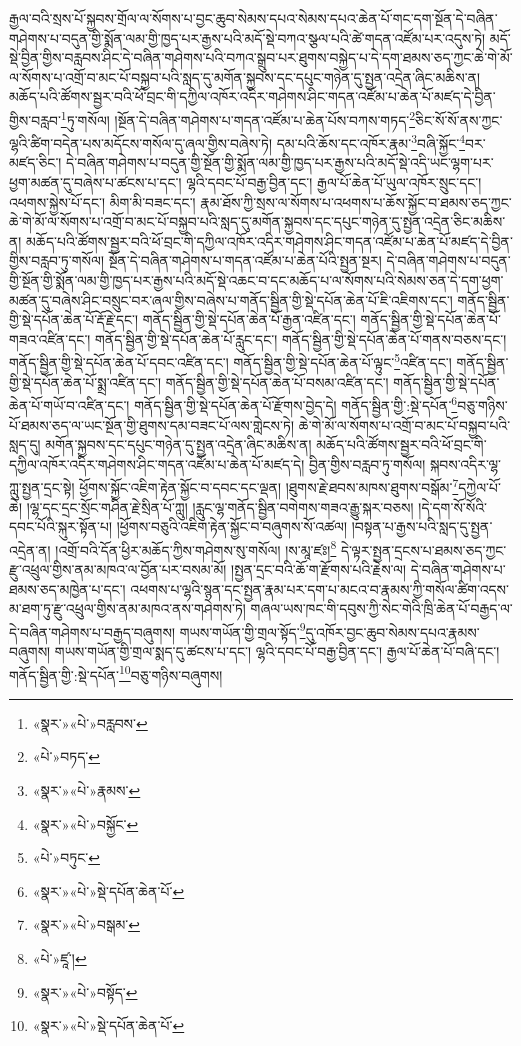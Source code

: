 རྒྱལ་བའི་སྲས་པོ་སྐྱབས་གྲོལ་ལ་སོགས་པ་བྱང་ཆུབ་སེམས་དཔའ་སེམས་དཔའ་ཆེན་པོ་གང་དག་སྔོན་དེ་བཞིན་གཤེགས་པ་བདུན་གྱི་སྨོན་ལམ་གྱི་ཁྱད་པར་རྒྱས་པའི་མདོ་སྡེ་བཀའ་སྩལ་པའི་ཚེ་གདན་འཛོམ་པར་འདུས་ཏེ། མདོ་སྡེ་བྱིན་གྱིས་བརླབས་ཤིང་དེ་བཞིན་གཤེགས་པའི་བཀའ་སྒྲུབ་པར་ཐུགས་བསྐྱེད་པ་དེ་དག་ཐམས་ཅད་ཀྱང་ཆེ་གེ་མོ་ལ་སོགས་པ་འགྲོ་བ་མང་པོ་བསྐྱབ་པའི་སླད་དུ་མགོན་སྐྱབས་དང་དཔུང་གཉེན་དུ་སྤྱན་འདྲེན་ཞིང་མཆིས་ན། མཆོད་པའི་ཚོགས་སྦྱར་བའི་ཕོ་བྲང་གི་དཀྱིལ་འཁོར་འདིར་གཤེགས་ཤིང་གདན་འཛོམ་པ་ཆེན་པོ་མཛད་དེ་བྱིན་གྱིས་བརླབ་\footnote{«སྣར་»«པེ་»བརླབས་}ཏུ་གསོལ། །སྔོན་དེ་བཞིན་གཤེགས་པ་གདན་འཛོམ་པ་ཆེན་པོས་བཀས་གཏད་\footnote{«པེ་»བཏད་}ཅིང་སོ་སོ་ནས་ཀྱང་ལྷའི་ཚིག་བདེན་པས་མདོངས་གསོལ་དུ་ཞལ་གྱིས་བཞེས་ཏེ། དམ་པའི་ཆོས་དང་འཁོར་རྣམ་\footnote{«སྣར་»«པེ་»རྣམས་}བཞི་སྐྱོང་\footnote{«སྣར་»«པེ་»བསྐྱོང་}བར་མཛད་ཅིང་། དེ་བཞིན་གཤེགས་པ་བདུན་གྱི་སྔོན་གྱི་སྨོན་ལམ་གྱི་ཁྱད་པར་རྒྱས་པའི་མདོ་སྡེ་འདི་ཡང་ལྷག་པར་ཕྱག་མཚན་དུ་བཞེས་པ་ཚངས་པ་དང་། ལྷའི་དབང་པོ་བརྒྱ་བྱིན་དང་། རྒྱལ་པོ་ཆེན་པོ་ཡུལ་འཁོར་སྲུང་དང་། འཕགས་སྐྱེས་པོ་དང་། མིག་མི་བཟང་དང་། རྣམ་ཐོས་ཀྱི་སྲས་ལ་སོགས་པ་འཕགས་པ་ཆོས་སྐྱོང་བ་ཐམས་ཅད་ཀྱང་ཆེ་གེ་མོ་ལ་སོགས་པ་འགྲོ་བ་མང་པོ་བསྐྱབ་པའི་སླད་དུ་མགོན་སྐྱབས་དང་དཔུང་གཉེན་དུ་སྤྱན་འདྲེན་ཅིང་མཆིས་ན། མཆོད་པའི་ཚོགས་སྦྱར་བའི་ཕོ་བྲང་གི་དཀྱིལ་འཁོར་འདིར་གཤེགས་ཤིང་གདན་འཛོམ་པ་ཆེན་པོ་མཛད་དེ་བྱིན་གྱིས་བརླབ་ཏུ་གསོལ། སྔོན་དེ་བཞིན་གཤེགས་པ་གདན་འཛོམ་པ་ཆེན་པོའི་སྤྱན་སྔར། དེ་བཞིན་གཤེགས་པ་བདུན་གྱི་སྔོན་གྱི་སྨོན་ལམ་གྱི་ཁྱད་པར་རྒྱས་པའི་མདོ་སྡེ་འཆང་བ་དང་མཆོད་པ་ལ་སོགས་པའི་སེམས་ཅན་དེ་དག་ཕྱག་མཚན་དུ་བཞེས་ཤིང་བསྲུང་བར་ཞལ་གྱིས་བཞེས་པ་གནོད་སྦྱིན་གྱི་སྡེ་དཔོན་ཆེན་པོ་ཇི་འཇིགས་དང་། གནོད་སྦྱིན་གྱི་སྡེ་དཔོན་ཆེན་པོ་རྡོ་རྗེ་དང་། གནོད་སྦྱིན་གྱི་སྡེ་དཔོན་ཆེན་པོ་རྒྱན་འཛིན་དང་། གནོད་སྦྱིན་གྱི་སྡེ་དཔོན་ཆེན་པོ་གཟའ་འཛིན་དང་། གནོད་སྦྱིན་གྱི་སྡེ་དཔོན་ཆེན་པོ་རླུང་དང་། གནོད་སྦྱིན་གྱི་སྡེ་དཔོན་ཆེན་པོ་གནས་བཅས་དང་། གནོད་སྦྱིན་གྱི་སྡེ་དཔོན་ཆེན་པོ་དབང་འཛིན་དང་། གནོད་སྦྱིན་གྱི་སྡེ་དཔོན་ཆེན་པོ་ལྟུང་\footnote{«པེ་»བཏུང་}འཛིན་དང་། གནོད་སྦྱིན་གྱི་སྡེ་དཔོན་ཆེན་པོ་སྨྲ་འཛིན་དང་། གནོད་སྦྱིན་གྱི་སྡེ་དཔོན་ཆེན་པོ་བསམ་འཛིན་དང་། གནོད་སྦྱིན་གྱི་སྡེ་དཔོན་ཆེན་པོ་གཡོ་བ་འཛིན་དང་། གནོད་སྦྱིན་གྱི་སྡེ་དཔོན་ཆེན་པོ་རྫོགས་བྱེད་དེ། གནོད་སྦྱིན་གྱི་:སྡེ་དཔོན་\footnote{«སྣར་»«པེ་»སྡེ་དཔོན་ཆེན་པོ་}བཅུ་གཉིས་པོ་ཐམས་ཅད་ལ་ཡང་སྔོན་གྱི་ཐུགས་དམ་བཟང་པོ་ལས་གླེངས་ཏེ། ཆེ་གེ་མོ་ལ་སོགས་པ་འགྲོ་བ་མང་པོ་བསྐྱབ་པའི་སླད་དུ། མགོན་སྐྱབས་དང་དཔུང་གཉེན་དུ་སྤྱན་འདྲེན་ཞིང་མཆིས་ན། མཆོད་པའི་ཚོགས་སྦྱར་བའི་ཕོ་བྲང་གི་དཀྱིལ་འཁོར་འདིར་གཤེགས་ཤིང་གདན་འཛོམ་པ་ཆེན་པོ་མཛད་དེ། བྱིན་གྱིས་བརླབ་ཏུ་གསོལ། སྐབས་འདིར་ལྷ་ཀླུ་སྤྱན་དྲང་སྟེ། ཕྱོགས་སྐྱོང་འཇིག་རྟེན་སྐྱོང་བ་དབང་དང་ལྡན། །ཐུགས་རྗེ་ཐབས་མཁས་ཐུགས་བསྒོམ་\footnote{«སྣར་»«པེ་»བསྒམ་}དཀྱེལ་པོ་ཆེ། །ལྷ་དང་དྲང་སྲོང་གཤིན་རྗེ་སྲིན་པོ་ཀླུ། །རླུང་ལྷ་གནོད་སྦྱིན་བགེགས་གཟའ་རྒྱུ་སྐར་བཅས། །དེ་དག་སོ་སོའི་དབང་པོའི་སྐུར་སྟོན་པ། །ཕྱོགས་བཅུའི་འཇིག་རྟེན་སྐྱོང་བ་བཞུགས་སོ་འཚལ། །བསྟན་པ་རྒྱས་པའི་སླད་དུ་སྤྱན་འདྲེན་ན། །འགྲོ་བའི་དོན་ཕྱིར་མཆོད་ཀྱིས་གཤེགས་སུ་གསོལ། །ས་མཱ་ཛཿ།\footnote{«པེ་»ཛཱ་།} དེ་ལྟར་སྤྱན་དྲངས་པ་ཐམས་ཅད་ཀྱང་རྫུ་འཕྲུལ་གྱིས་ནམ་མཁའ་ལ་བྱོན་པར་བསམ་མོ། །སྤྱན་དྲང་བའི་ཆོ་ག་རྫོགས་པའི་རྗེས་ལ། དེ་བཞིན་གཤེགས་པ་ཐམས་ཅད་མཁྱེན་པ་དང་། འཕགས་པ་ལྷའི་སྙན་དང་སྤྱན་རྣམ་པར་དག་པ་མངའ་བ་རྣམས་ཀྱི་གསོལ་ཚིག་འདས་མ་ཐག་ཏུ་རྫུ་འཕྲུལ་གྱིས་ནམ་མཁའ་ནས་གཤེགས་ཏེ། གཞལ་ཡས་ཁང་གི་དབུས་ཀྱི་སེང་གེའི་ཁྲི་ཆེན་པོ་བརྒྱད་ལ་དེ་བཞིན་གཤེགས་པ་བརྒྱད་བཞུགས། གཡས་གཡོན་གྱི་གྲལ་སྟོད་\footnote{«སྣར་»«པེ་»བསྟོད་}དུ་འཁོར་བྱང་ཆུབ་སེམས་དཔའ་རྣམས་བཞུགས། གཡས་གཡོན་གྱི་གྲལ་སྨད་དུ་ཚངས་པ་དང་། ལྷའི་དབང་པོ་བརྒྱ་བྱིན་དང་། རྒྱལ་པོ་ཆེན་པོ་བཞི་དང་། གནོད་སྦྱིན་གྱི་:སྡེ་དཔོན་\footnote{«སྣར་»«པེ་»སྡེ་དཔོན་ཆེན་པོ་}བཅུ་གཉིས་བཞུགས། 